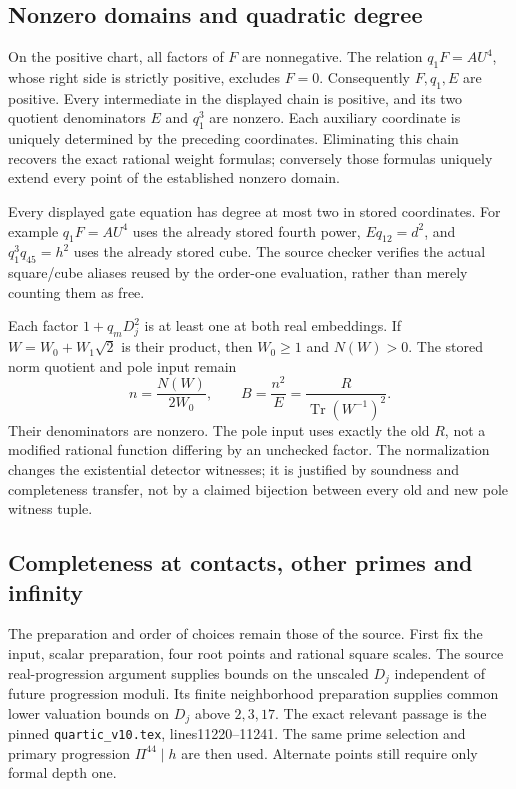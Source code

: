 \subsection{Nonzero domains and quadratic degree}

On the positive chart, all factors of $F$ are nonnegative. The relation
$q_1F=AU^4$, whose right side is strictly positive, excludes $F=0$.
Consequently $F,q_1,E$ are positive. Every intermediate in the displayed
chain is positive, and its two quotient denominators $E$ and $q_1^3$
are nonzero. Each auxiliary coordinate is uniquely determined by the
preceding coordinates. Eliminating this chain recovers the exact rational
weight formulas; conversely those formulas uniquely extend every point
of the established nonzero domain.

Every displayed gate equation has degree at most two in stored
coordinates. For example $q_1F=AU^4$ uses the already stored fourth
power, $Eq_{12}=d^2$, and $q_1^3q_{45}=h^2$ uses the already stored cube.
The source checker verifies the actual square/cube aliases reused by the
order-one evaluation, rather than merely counting them as free.

Each factor $1+q_mD_j^2$ is at least one at both real embeddings. If
$W=W_0+W_1\sqrt2$ is their product, then $W_0\ge1$ and $N(W)>0$.
The stored norm quotient and pole input remain
\[
 n=\frac{N(W)}{2W_0},\qquad B=\frac{n^2}{E}
   =\frac{R}{\operatorname{Tr}(W^{-1})^2}.
\]
Their denominators are nonzero. The pole input uses exactly the old
$R$, not a modified rational function differing by an unchecked factor.
The normalization changes the existential detector witnesses; it is
justified by soundness and completeness transfer, not by a claimed
bijection between every old and new pole witness tuple.

\subsection{Completeness at contacts, other primes and infinity}

The preparation and order of choices remain those of the source.
First fix the input, scalar preparation, four root points and rational
square scales. The source real-progression argument supplies bounds on
the unscaled $D_j$ independent of future progression moduli. Its finite
neighborhood preparation supplies common lower valuation bounds on
$D_j$ above $2,3,17$. The exact relevant passage is the pinned
\texttt{quartic\_v10.tex}, lines11220--11241. The same prime selection
and primary progression $\Pi^{44}\mid h$ are then used. Alternate
points still require only formal depth one.

